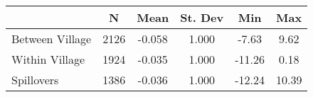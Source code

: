 \begin{tabular}{l*{5}{c}}\hline&\multicolumn{1}{c}{N}&\multicolumn{1}{c}{Mean}&\multicolumn{1}{c}{St. Dev}&\multicolumn{1}{c}{Min}&\multicolumn{1}{c}{Max}\\ \hline 
Between Village & 2126 & -0.058 & 1.000 & -7.63 & 9.62 \\
Within Village & 1924 & -0.035 & 1.000 & -11.26 & 0.18 \\
Spillovers & 1386 & -0.036 & 1.000 & -12.24 & 10.39 \\
\hline \end{tabular}
